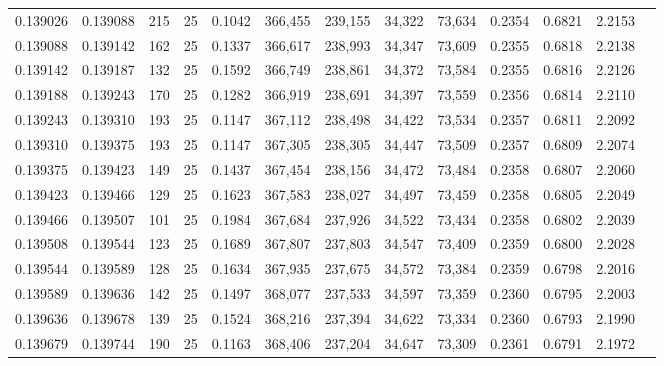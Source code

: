 \begin{tabular}{rrrrrrrrrrrrr}
0.139026 & 0.139088 &   215 &  25 &                                     0.1042 & 366,455 & 239,155 &  34,322 &  73,634 & 0.2354 & 0.6821 & 2.2153 \\
0.139088 & 0.139142 &   162 &  25 &                                     0.1337 & 366,617 & 238,993 &  34,347 &  73,609 & 0.2355 & 0.6818 & 2.2138 \\
0.139142 & 0.139187 &   132 &  25 &                                     0.1592 & 366,749 & 238,861 &  34,372 &  73,584 & 0.2355 & 0.6816 & 2.2126 \\
0.139188 & 0.139243 &   170 &  25 &                                     0.1282 & 366,919 & 238,691 &  34,397 &  73,559 & 0.2356 & 0.6814 & 2.2110 \\
0.139243 & 0.139310 &   193 &  25 &                                     0.1147 & 367,112 & 238,498 &  34,422 &  73,534 & 0.2357 & 0.6811 & 2.2092 \\
0.139310 & 0.139375 &   193 &  25 &                                     0.1147 & 367,305 & 238,305 &  34,447 &  73,509 & 0.2357 & 0.6809 & 2.2074 \\
0.139375 & 0.139423 &   149 &  25 &                                     0.1437 & 367,454 & 238,156 &  34,472 &  73,484 & 0.2358 & 0.6807 & 2.2060 \\
0.139423 & 0.139466 &   129 &  25 &                                     0.1623 & 367,583 & 238,027 &  34,497 &  73,459 & 0.2358 & 0.6805 & 2.2049 \\
0.139466 & 0.139507 &   101 &  25 &                                     0.1984 & 367,684 & 237,926 &  34,522 &  73,434 & 0.2358 & 0.6802 & 2.2039 \\
0.139508 & 0.139544 &   123 &  25 &                                     0.1689 & 367,807 & 237,803 &  34,547 &  73,409 & 0.2359 & 0.6800 & 2.2028 \\
0.139544 & 0.139589 &   128 &  25 &                                     0.1634 & 367,935 & 237,675 &  34,572 &  73,384 & 0.2359 & 0.6798 & 2.2016 \\
0.139589 & 0.139636 &   142 &  25 &                                     0.1497 & 368,077 & 237,533 &  34,597 &  73,359 & 0.2360 & 0.6795 & 2.2003 \\
0.139636 & 0.139678 &   139 &  25 &                                     0.1524 & 368,216 & 237,394 &  34,622 &  73,334 & 0.2360 & 0.6793 & 2.1990 \\
0.139679 & 0.139744 &   190 &  25 &                                     0.1163 & 368,406 & 237,204 &  34,647 &  73,309 & 0.2361 & 0.6791 & 2.1972 \\

\end{tabular}
